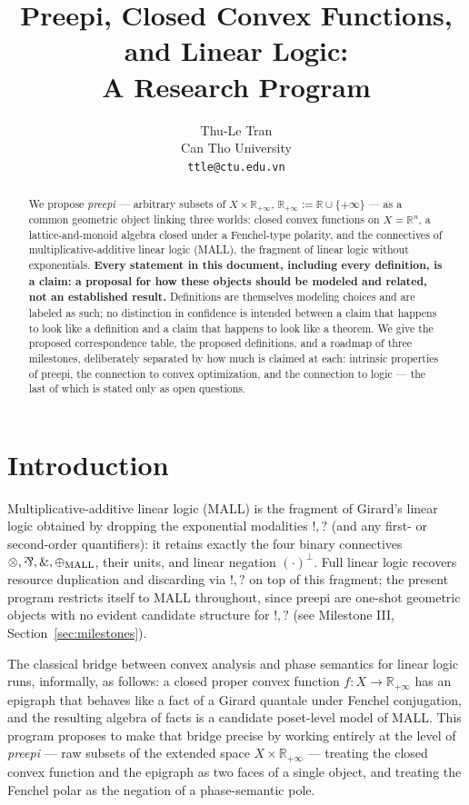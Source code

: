 \documentclass[11pt]{article}
\title{Preepi, Closed Convex Functions, and Linear Logic:\\
\large A Research Program}
\author{Thu-Le Tran\\
Can Tho University\\
\texttt{ttle@ctu.edu.vn}}
\date{}
\newcommand{\R}{\mathbb R}
\newcommand{\Rp}{\mathbb R_{+\infty}}
\newcommand{\parr}{\mathbin{\text{\rotatebox[origin=c]{180}{\&}}}}
\begin{document}
\maketitle

\begin{abstract}
We propose \emph{preepi} — arbitrary subsets of $X\times\R_{+\infty}$,
$\R_{+\infty}:=\R\cup\{+\infty\}$ — as a common geometric object linking
three worlds: closed convex functions on $X=\R^n$, a lattice-and-monoid
algebra closed under a Fenchel-type polarity, and the connectives of
multiplicative-additive linear logic (MALL), the fragment of linear logic
without exponentials. \textbf{Every statement in this document, including
every definition, is a claim: a proposal for how these objects should be
modeled and related, not an established result.} Definitions are
themselves modeling choices and are labeled as such; no distinction in
confidence is intended between a claim that happens to look like a
definition and a claim that happens to look like a theorem. We give the
proposed correspondence table, the proposed definitions, and a roadmap of
three milestones, deliberately separated by how much is claimed at each:
intrinsic properties of preepi, the connection to convex optimization, and
the connection to logic — the last of which is stated only as open
questions.
\end{abstract}

\tableofcontents

\section{Introduction}

Multiplicative-additive linear logic (MALL) is the fragment of Girard's
linear logic obtained by dropping the exponential modalities $!,?$ (and any
first- or second-order quantifiers): it retains exactly the four binary
connectives $\otimes,\parr,\&,\oplus_{\mathrm{MALL}}$, their units, and
linear negation $(\cdot)^\bot$. Full linear logic recovers resource
duplication and discarding via $!,?$ on top of this fragment; the present
program restricts itself to MALL throughout, since preepi are one-shot
geometric objects with no evident candidate structure for $!,?$ (see
Milestone III, Section~\ref{sec:milestones}).

The classical bridge between convex analysis and phase semantics for linear
logic runs, informally, as follows: a closed proper convex function
$f:X\to\Rp$ has an epigraph that behaves like a fact of a Girard quantale
under Fenchel conjugation, and the resulting algebra of facts is a
candidate poset-level model of MALL. This program proposes to make that
bridge precise by working entirely at the level of \emph{preepi} — raw
subsets of the extended space $X\times\Rp$ — treating the closed convex
function and the epigraph as two faces of a single object, and treating the
Fenchel polar as the negation of a phase-semantic pole.
\end{document}
